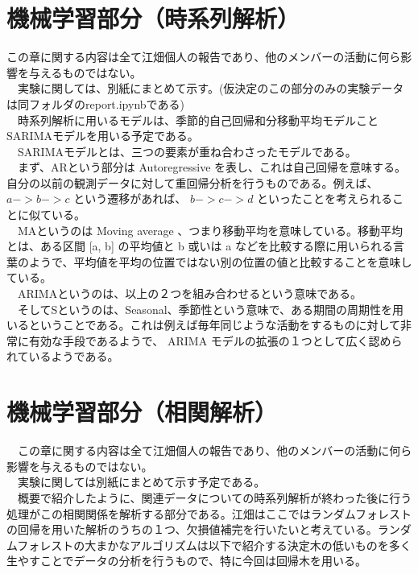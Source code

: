 \documentclass{scrartcl}
\begin{document}
\section{機械学習部分（時系列解析）}
\label{sec:org5f136a4}
  この章に関する内容は全て江畑個人の報告であり、他のメンバーの活動に何ら影響を与えるものではない。\\
　実験に関しては、別紙にまとめて示す。(仮決定のこの部分のみの実験データは同フォルダのreport.ipynbである)\\
　時系列解析に用いるモデルは、季節的自己回帰和分移動平均モデルことSARIMAモデルを用いる予定である。\\
　SARIMAモデルとは、三つの要素が重ね合わさったモデルである。\\
　まず、ARという部分は Autoregressive を表し、これは自己回帰を意味する。自分の以前の観測データに対して重回帰分析を行うものである。例えば、 \(a->b->c\) という遷移があれば、 \(b->c->d\) といったことを考えられることに似ている。\\
　MAというのは Moving average 、つまり移動平均を意味している。移動平均とは、ある区間 [a, b] の平均値と b 或いは a などを比較する際に用いられる言葉のようで、平均値を平均の位置ではない別の位置の値と比較することを意味している。\\
　ARIMAというのは、以上の２つを組み合わせるという意味である。\\
　そしてSというのは、Seasonal、季節性という意味で、ある期間の周期性を用いるということである。これは例えば毎年同じような活動をするものに対して非常に有効な手段であるようで、 ARIMA モデルの拡張の１つとして広く認められているようである。\\

\section{機械学習部分（相関解析）}
\label{sec:org5c5dcc0}
　この章に関する内容は全て江畑個人の報告であり、他のメンバーの活動に何ら影響を与えるものではない。\\
　実験に関しては別紙にまとめて示す予定である。\\
　概要で紹介したように、関連データについての時系列解析が終わった後に行う処理がこの相関関係を解析する部分である。江畑はここではランダムフォレストの回帰を用いた解析のうちの１つ、欠損値補完を行いたいと考えている。ランダムフォレストの大まかなアルゴリズムは以下で紹介する決定木の低いものを多く生やすことでデータの分析を行うもので、特に今回は回帰木を用いる。\\
\end{document}
